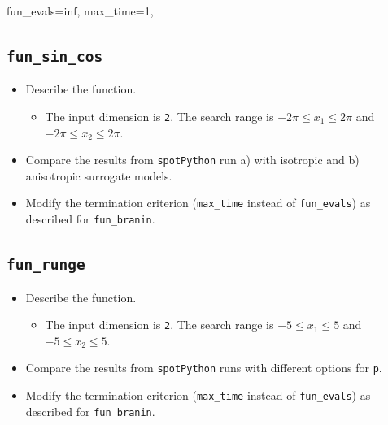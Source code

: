 \documentclass[
  letterpaper,
  DIV=11,
  numbers=noendperiod]{scrreprt}
\newenvironment{Shaded}{\begin{snugshade}}{\end{snugshade}}
\newcommand{\DecValTok}[1]{\textcolor[rgb]{0.68,0.00,0.00}{#1}}
\newcommand{\NormalTok}[1]{\textcolor[rgb]{0.00,0.23,0.31}{#1}}
\newcommand{\OperatorTok}[1]{\textcolor[rgb]{0.37,0.37,0.37}{#1}}
\providecommand{\tightlist}{%
  \setlength{\itemsep}{0pt}\setlength{\parskip}{0pt}}\usepackage{longtable,booktabs,array}
\begin{document}
\begin{Shaded}
\begin{Highlighting}[]
\NormalTok{fun\_evals}\OperatorTok{=}\NormalTok{inf,}
\NormalTok{max\_time}\OperatorTok{=}\DecValTok{1}\NormalTok{,}
\end{Highlighting}
\end{Shaded}

\subsection{\texorpdfstring{\texttt{fun\_sin\_cos}}{fun\_sin\_cos}}\label{fun_sin_cos-1}

\begin{itemize}
\tightlist
\item
  Describe the function.

  \begin{itemize}
  \tightlist
  \item
    The input dimension is \texttt{2}. The search range is
    \(-2\pi \leq x_1 \leq 2\pi\) and \(-2\pi \leq x_2 \leq 2\pi\).
  \end{itemize}
\item
  Compare the results from \texttt{spotPython} run a) with isotropic and
  b) anisotropic surrogate models.
\item
  Modify the termination criterion (\texttt{max\_time} instead of
  \texttt{fun\_evals}) as described for \texttt{fun\_branin}.
\end{itemize}

\subsection{\texorpdfstring{\texttt{fun\_runge}}{fun\_runge}}\label{fun_runge-3}

\begin{itemize}
\tightlist
\item
  Describe the function.

  \begin{itemize}
  \tightlist
  \item
    The input dimension is \texttt{2}. The search range is
    \(-5 \leq x_1 \leq 5\) and \(-5 \leq x_2 \leq 5\).
  \end{itemize}
\item
  Compare the results from \texttt{spotPython} runs with different
  options for \texttt{p}.
\item
  Modify the termination criterion (\texttt{max\_time} instead of
  \texttt{fun\_evals}) as described for \texttt{fun\_branin}.
\end{itemize}
\end{document}
